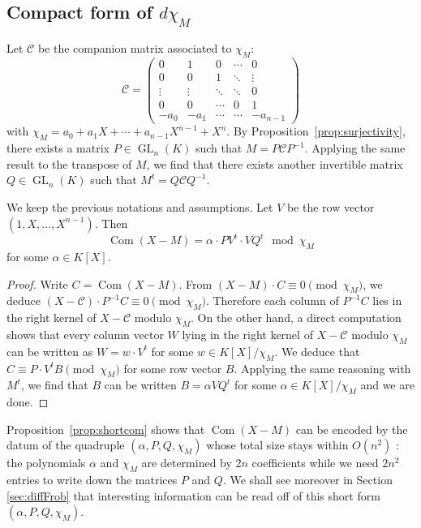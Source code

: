 \documentclass{sig-alternate-05-2015}
\DeclareMathOperator{\GL}{GL}
\DeclareMathOperator{\com}{Com}
\begin{document}
\subsection{Compact form of $d \chi_M$}

Let $\mathscr{C}$ be the companion matrix associated to $\chi_M$:
\begin{equation}
\label{eq:companion}
\mathscr{C} = \left( \begin{matrix}
0 & 1 & 0 & \cdots & 0 \\
0 & 0 & 1 & \ddots & \vdots \\
\vdots & \vdots & \ddots & \ddots & 0 \\
0 & 0 & \cdots & 0 & 1 \\
-a_0 & -a_1 & \cdots & \cdots & -a_{n-1}
\end{matrix} \right)
\end{equation}
with $\chi_M = a_0 + a_1 X + \cdots + a_{n-1} X^{n-1} + X^n$.
By Proposition~\ref{prop:surjectivity}, there exists a matrix 
$P \in \GL_n(K)$ such that $M = P \mathscr{C} P^{-1}$. Applying the same
result to the transpose of $M$, we find that there exists another
invertible matrix $Q \in \GL_n(K)$ such that $M^t = Q \mathscr{C} Q^{-1}$.

\begin{prop}
\label{prop:shortcom}
We keep the previous notations and assumptions.
Let $V$ be the row vector $(1, X, \ldots, X^{n-1})$. Then
\begin{equation}
\label{eq:shortcom}
\com(X{-}M) = \alpha \cdot P V^t \cdot V Q^t
\mod \chi_M
\end{equation}
for some $\alpha \in K[X]$.
\end{prop}

\begin{proof}
Write $C = \com(X{-}M)$. From $(X{-}M) \cdot C \equiv 0 
\pmod{\chi_M}$, we deduce $(X{-}\mathscr{C}) \cdot P^{-1} C \equiv 0 \pmod{\chi_M}$. 
Therefore each column of $P^{-1} C$ lies in the right kernel of $X{-}\mathscr{C}$
modulo $\chi_M$. On the other hand, a direct computation shows that
every column vector $W$ lying in the right kernel of $X{-}\mathscr{C}$ modulo 
$\chi_M$ can be written as $W = w \cdot V^t$ for some $w \in 
K[X]/\chi_M$. We deduce that $C \equiv P \cdot V^t B \pmod{\chi_M}$
for some row vector $B$.
Applying the same reasoning with $M^t$, we find that $B$ can be
written $B = \alpha V Q^t$ for some $\alpha \in K[X]/\chi_M$ and
we are done.
\end{proof}

Proposition~\ref{prop:shortcom} shows that $\com(X{-}M)$ can be encoded 
by the datum of the quadruple $(\alpha, P, Q, \chi_M)$ whose total size 
stays within $O(n^2)$ : the polynomials $\alpha$ and $\chi_M$ are 
determined by $2n$ coefficients while we need $2n^2$ entries to 
write down the matrices $P$ and $Q$. 
We shall see moreover in Section \ref{sec:diffFrob} that interesting
information can be read off of this short form $(\alpha, P, Q, 
\chi_M)$.
\end{document}
